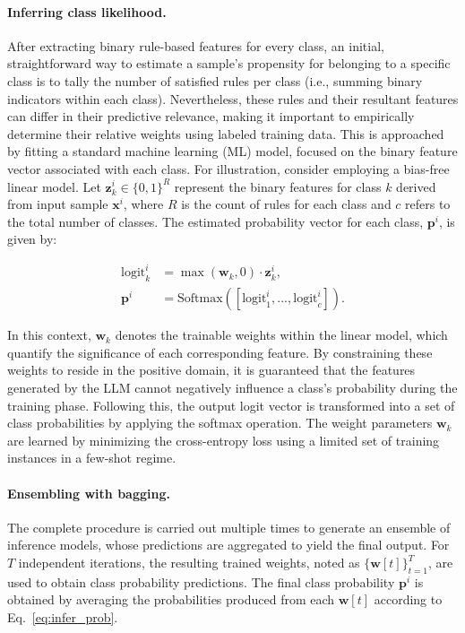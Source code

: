 \paragraph{Inferring class likelihood.} After extracting binary rule-based features for every class, an initial, straightforward way to estimate a sample's propensity for belonging to a specific class is to tally the number of satisfied rules per class (i.e., summing binary indicators within each class). Nevertheless, these rules and their resultant features can differ in their predictive relevance, making it important to empirically determine their relative weights using labeled training data. This is approached by fitting a standard machine learning (ML) model, focused on the binary feature vector associated with each class. For illustration, consider employing a bias-free linear model. Let $\mathbf{z}_k^i \in \{0, 1\}^R$ represent the binary features for class $k$ derived from input sample $\mathbf{x}^i$, where $R$ is the count of rules for each class and $c$ refers to the total number of classes. The estimated probability vector for each class, $\mathbf{p}^i$, is given by:

\begin{align}
\text{logit}_k^i &= \max(\mathbf{w}_k, 0) \cdot \mathbf{z}_k^i, \nonumber \\
\mathbf{p}^i &= \text{Softmax}({[\text{logit}_{1}^i, ..., \text{logit}_{c}^i]}). \label{eq:infer_prob}
\end{align}

In this context, $\mathbf{w}_k$ denotes the trainable weights within the linear model, which quantify the significance of each corresponding feature. By constraining these weights to reside in the positive domain, it is guaranteed that the features generated by the LLM cannot negatively influence a class’s probability during the training phase. Following this, the output logit vector is transformed into a set of class probabilities by applying the softmax operation. The weight parameters $\mathbf{w}_k$ are learned by minimizing the cross-entropy loss using a limited set of training instances in a few-shot regime.

\vspace*{-0.12in}
\paragraph{Ensembling with bagging.} The complete procedure is carried out multiple times to generate an ensemble of inference models, whose predictions are aggregated to yield the final output. For $T$ independent iterations, the resulting trained weights, noted as $\{\mathbf{w}[t]\}_{t=1}^T$, are used to obtain class probability predictions. The final class probability $\mathbf{p}^i$ is obtained by averaging the probabilities produced from each $\mathbf{w}[t]$ according to Eq.~\ref{eq:infer_prob}.

